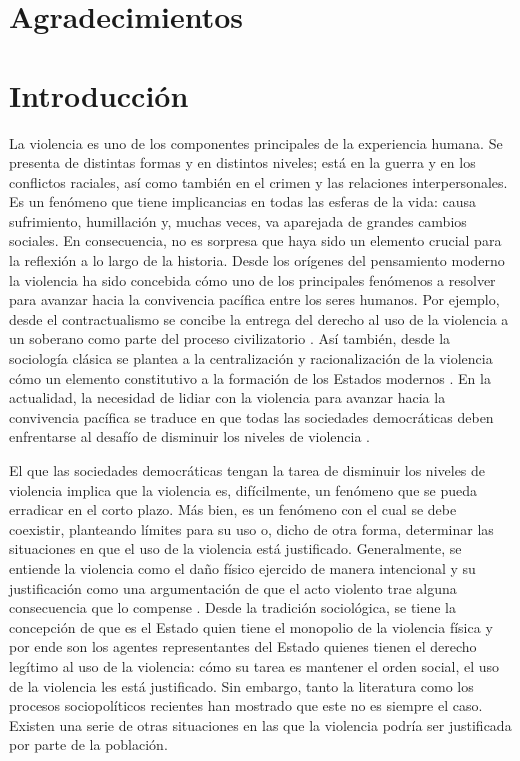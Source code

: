 \documentclass[12pt,twoside]{templates/facsothesis}
\begin{document}
\hypertarget{agradecimientos}{%
\chapter*{Agradecimientos}\label{agradecimientos}}

\hypertarget{introducciuxf3n}{%
\chapter{Introducción}\label{introducciuxf3n}}

La violencia es uno de los componentes principales de la experiencia humana. Se presenta de distintas formas y en distintos niveles; está en la guerra y en los conflictos raciales, así como también en el crimen y las relaciones interpersonales. Es un fenómeno que tiene implicancias en todas las esferas de la vida: causa sufrimiento, humillación y, muchas veces, va aparejada de grandes cambios sociales. En consecuencia, no es sorpresa que haya sido un elemento crucial para la reflexión a lo largo de la historia. Desde los orígenes del pensamiento moderno la violencia ha sido concebida cómo uno de los principales fenómenos a resolver para avanzar hacia la convivencia pacífica entre los seres humanos. Por ejemplo, desde el contractualismo se concibe la entrega del derecho al uso de la violencia a un soberano como parte del proceso civilizatorio \citep[1651{]}]{Hobbes2002}. Así también, desde la sociología clásica se plantea a la centralización y racionalización de la violencia cómo un elemento constitutivo a la formación de los Estados modernos \citep[1919{]}]{Weber1996}. En la actualidad, la necesidad de lidiar con la violencia para avanzar hacia la convivencia pacífica se traduce en que todas las sociedades democráticas deben enfrentarse al desafío de disminuir los niveles de violencia \citep{Gerber2017, Keane2004}.

El que las sociedades democráticas tengan la tarea de disminuir los niveles de violencia implica que la violencia es, difícilmente, un fenómeno que se pueda erradicar en el corto plazo. Más bien, es un fenómeno con el cual se debe coexistir, planteando límites para su uso \citep{Keane2004} o, dicho de otra forma, determinar las situaciones en que el uso de la violencia está justificado. Generalmente, se entiende la violencia como el daño físico ejercido de manera intencional \citep{Bufacchi2005} y su justificación como una argumentación de que el acto violento trae alguna consecuencia que lo compense \citep{Frazer2020}. Desde la tradición sociológica, se tiene la concepción de que es el Estado quien tiene el monopolio de la violencia física \citep[1919{]}]{Weber1996} y por ende son los agentes representantes del Estado quienes tienen el derecho legítimo al uso de la violencia: cómo su tarea es mantener el orden social, el uso de la violencia les está justificado. Sin embargo, tanto la literatura como los procesos sociopolíticos recientes han mostrado que este no es siempre el caso. Existen una serie de otras situaciones en las que la violencia podría ser justificada por parte de la población.
\end{document}
